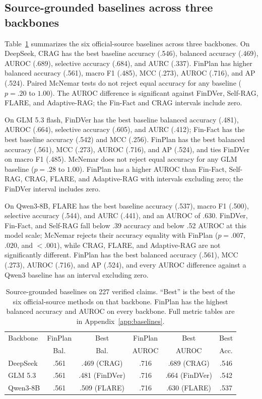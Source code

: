 \documentclass[11pt]{article}
\newcommand{\method}{FinPlan}
\begin{document}
\subsection{Source-grounded baselines across three backbones}
Table~\ref{tab:cross-backbone} summarizes the six official-source baselines across three backbones. On DeepSeek, CRAG has the best baseline accuracy (.546), balanced accuracy (.469), AUROC (.689), selective accuracy (.684), and AURC (.337). \method{} has higher balanced accuracy (.561), macro F1 (.485), MCC (.273), AUROC (.716), and AP (.524). Paired McNemar tests do not reject equal accuracy for any baseline ($p=.20$ to $1.00$). The AUROC difference is significant against FinDVer, Self-RAG, FLARE, and Adaptive-RAG; the Fin-Fact and CRAG intervals include zero.

On GLM 5.3 flash, FinDVer has the best baseline balanced accuracy (.481), AUROC (.664), selective accuracy (.605), and AURC (.412); Fin-Fact has the best baseline accuracy (.542) and MCC (.256). \method{} has the best balanced accuracy (.561), MCC (.273), AUROC (.716), and AP (.524), and ties FinDVer on macro F1 (.485). McNemar does not reject equal accuracy for any GLM baseline ($p=.28$ to $1.00$). \method{} has a higher AUROC than Fin-Fact, Self-RAG, CRAG, FLARE, and Adaptive-RAG with intervals excluding zero; the FinDVer interval includes zero.

On Qwen3-8B, FLARE has the best baseline accuracy (.537), macro F1 (.500), selective accuracy (.544), and AURC (.441), and an AUROC of .630. FinDVer, Fin-Fact, and Self-RAG fall below .39 accuracy and below .52 AUROC at this model scale; McNemar rejects their accuracy equality with \method{} ($p=.007$, $.020$, and $<.001$), while CRAG, FLARE, and Adaptive-RAG are not significantly different. \method{} has the best balanced accuracy (.561), MCC (.273), AUROC (.716), and AP (.524), and every AUROC difference against a Qwen3 baseline has an interval excluding zero.

\begin{table}[t]
\centering
\scriptsize
\setlength{\tabcolsep}{2pt}
\begin{tabular}{lccccc}
\toprule
Backbone & \method{} & Best & \method{} & Best & Best \\
 & Bal. & Bal. & AUROC & AUROC & Acc. \\
\midrule
DeepSeek & .561 & .469 (CRAG) & .716 & .689 (CRAG) & .546 \\
GLM 5.3 & .561 & .481 (FinDVer) & .716 & .664 (FinDVer) & .542 \\
Qwen3-8B & .561 & .509 (FLARE) & .716 & .630 (FLARE) & .537 \\
\bottomrule
\end{tabular}
\caption{Source-grounded baselines on 227 verified claims. ``Best'' is the best of the six official-source methods on that backbone. \method{} has the highest balanced accuracy and AUROC on every backbone. Full metric tables are in Appendix~\ref{app:baselines}.}
\label{tab:cross-backbone}
\end{table}
\end{document}
